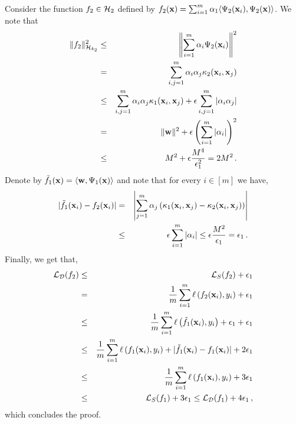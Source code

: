 Consider the function $f_2\in {\cal H}_2$ defined by $f_2({\mathbf x})=\sum_{i=1}^m\alpha_1\langle \Psi_2({\mathbf x}_i),\Psi_2({\mathbf x}) \rangle$. We note that
\begin{eqnarray*}
\|f_2\|^2_{{\cal H}_{k_2}} &\le & \left\|\sum_{i=1}^m\alpha_i\Psi_2({\mathbf x}_i)\right\|^2
\\
&=& \sum_{i,j=1}^m \alpha_i\alpha_j\kappa_2({\mathbf x}_i,{\mathbf x}_j)
\\
&\le& \sum_{i,j=1}^m \alpha_i\alpha_j\kappa_1({\mathbf x}_i,{\mathbf x}_j)+\epsilon\sum_{i,j=1}^m |\alpha_i\alpha_j|
\\
&=& \|{\mathbf w}\|^2+\epsilon \left(\sum_{i=1}^m |\alpha_i|\right)^2
\\
&\le& M^2+\epsilon \frac{M^4}{\epsilon^2_1} = 2M^2 \,.
\end{eqnarray*}
Denote by $\tilde f_1({\mathbf x}) = \langle {\mathbf w},\Psi_1({\mathbf x}) \rangle$ and note that for every
$i\in [m]$ we have,
\begin{eqnarray*}
|\tilde f_1({\mathbf x}_i)-f_2({\mathbf x}_i)| &=& \left|\sum_{j=1}^m\alpha_j\left(\kappa_1({\mathbf x}_i,{\mathbf x}_j)-\kappa_2({\mathbf x}_i,{\mathbf x}_j)\right)\right|
\\
&\le &\epsilon\sum_{i=1}^m|\alpha_i|\le
	\epsilon \frac{M^2}{\epsilon_1} = \epsilon_1 \,.
\end{eqnarray*}
Finally, we get that,
\begin{eqnarray*}
{\cal L}_{{\cal D}}(f_2) &\le& {\cal L}_{S}(f_2) + \epsilon_1
\\
&=& \frac{1}{m}\sum_{i=1}^m \ell\left(f_2({\mathbf x}_i),y_i\right) + \epsilon_1
\\
&\le& \frac{1}{m}\sum_{i=1}^m \ell\left(\tilde{f}_1({\mathbf x}_i),y_i\right) + \epsilon_1 + \epsilon_1
\\
&\le& \frac{1}{m}\sum_{i=1}^m \ell\left(f_1({\mathbf x}_i),y_i\right) + |\tilde f_1({\mathbf x}_i)-f_1({\mathbf x}_i)| + 2\epsilon_1
\\
&\le& \frac{1}{m}\sum_{i=1}^m \ell\left(f_1({\mathbf x}_i),y_i\right) + 3\epsilon_1
\\
&\le& {\cal L}_S(f_1) + 3\epsilon_1 \le {\cal L}_{{\cal D}}(f_1) + 4\epsilon_1 \,,
\end{eqnarray*}
which concludes the proof.\proofbox
